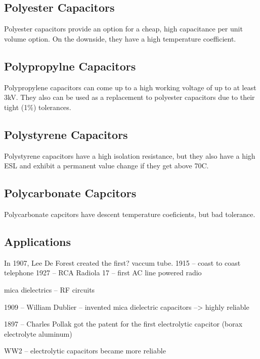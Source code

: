 \subsection{Polyester Capacitors}

Polyester capacitors provide an option for a cheap, high capacitance per unit volume option. On the downside, they have a high temperature coefficient. \cite{learn_caps}

\subsection{Polypropylne Capacitors}

Polypropylene capacitors can come up to a high working voltage of up to at least 3kV. They also can be used as a replacement to polyester capacitors due to their tight (1\%) tolerances.\cite{learn_caps}

\subsection{Polystyrene Capacitors}

Polystyrene capacitors have a high isolation resistance, but they also have a high ESL and exhibit a permanent value change if they get above 70C.
\cite{learn_caps}

\subsection{Polycarbonate Capcitors}

Polycarbonate capcitors have descent temperature coeficients, but bad tolerance.  \cite{learn_caps}

\subsection{Applications}

In 1907, Lee De Forest created the first? vaccum tube. \cite{deis_hist}
1915 -- coast to coast telephone
1927 -- RCA Radiola 17 -- first AC line powered radio

mica dielectrics -- RF circuits


1909 -- William Dublier -- invented mica dielectric capacitors
--> highly reliable


1897 -- Charles Pollak got the patent for the first electrolytic capcitor (borax electrolyte aluminum)

WW2 -- electrolytic capacitors became more reliable


